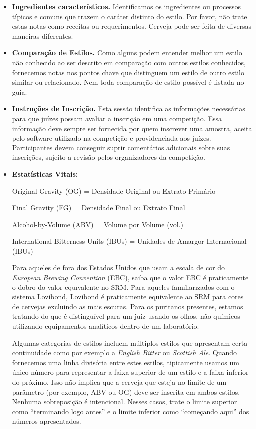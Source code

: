 \begin{itemize}
\item \textbf{Ingredientes característicos.} Identificamos os ingredientes ou processos típicos e comuns que trazem o caráter distinto do estilo. Por favor, não trate estas notas como receitas ou requerimentos. Cerveja pode ser feita de diversas maneiras diferentes.
\item \textbf{Comparação de Estilos.} Como alguns podem entender melhor um estilo não conhecido ao ser descrito em comparação com outros estilos conhecidos, fornecemos notas nos pontos chave que distinguem um estilo de outro estilo similar ou relacionado. Nem toda comparação de estilo possível é listada no guia.
\item \textbf{Instruções de Inscrição.} Esta sessão identifica as informações necessárias para que juízes possam avaliar a inscrição em uma competição. Essa informação deve sempre ser fornecida por quem inscrever uma amostra, aceita pelo software utilizado na competição e providenciada aos juízes. Participantes devem conseguir suprir comentários adicionais sobre suas inscrições, sujeito a revisão pelos organizadores da competição.
\item \textbf{Estatísticas Vitais:}

Original Gravity (OG) = Densidade Original ou Extrato Primário

Final Gravity (FG) = Densidade Final ou Extrato Final

Alcohol-by-Volume (ABV) = Volume por Volume (vol.)

International Bitterness Units (IBUs) = Unidades de Amargor Internacional (IBUs)

Para aqueles de fora dos Estados Unidos que usam a escala de cor do \textit{European Brewing Convention} (EBC), saiba que o valor EBC é praticamente o dobro do valor equivalente no SRM. Para aqueles familiarizados com o sistema Lovibond, Lovibond é praticamente equivalente ao SRM para cores de cervejas excluindo as mais escuras. Para os puritanos presentes, estamos tratando do que é distinguível para um juiz usando os olhos, não químicos utilizando equipamentos analíticos dentro de um laboratório.

Algumas categorias de estilos incluem múltiplos estilos que apresentam certa continuidade como por exemplo a \textit{English Bitter} ou \textit{Scottish Ale}. Quando fornecemos uma linha divisória entre estes estilos, tipicamente usamos um único número para representar a faixa superior de um estilo e a faixa inferior do próximo. Isso não implica que a cerveja que esteja no limite de um parâmetro (por exemplo, ABV ou OG) deve ser inscrita em ambos estilos. Nenhuma sobreposição é intencional. Nesses casos, trate o limite superior como “terminando logo antes” e o limite inferior como “começando aqui” dos números apresentados.


\end{itemize}
